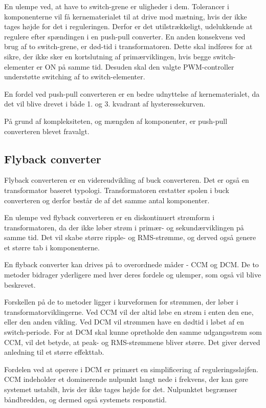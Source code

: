 En ulempe ved, at have to switch-grene er uligheder i dem. Tolerancer i komponenterne vil få kernematerialet til at drive mod mætning, hvis der ikke tages højde for det i reguleringen. Derfor er det utilstrækkeligt, udelukkende at regulere efter spændingen i en push-pull converter. En anden konsekvens ved brug af to switch-grene, er død-tid i transformatoren. Dette skal indføres for at sikre, der ikke sker en kortslutning af primærviklingen, hvis begge switch-elementer er ON på samme tid. Desuden skal den valgte PWM-controller understøtte switching af to switch-elementer. 

En fordel ved push-pull converteren er en bedre udnyttelse af kernematerialet, da det vil blive drevet i både 1. og 3. kvadrant af hysteressekurven. 

På grund af kompleksiteten, og mængden af komponenter, er push-pull converteren blevet fravalgt. 

\subsection{Flyback converter}
Flyback converteren er en videreudvikling af buck converteren. Det er også en transformator baseret typologi. Transformatoren erstatter spolen i buck converteren og derfor består de af det samme antal komponenter.

En ulempe ved flyback converteren er en diskontinuert strømform i transformatoren, da der ikke løber strøm i primær- og sekundærviklingen på samme tid. Det vil skabe større ripple- og RMS-strømme, og derved også genere et større tab i komponenterne\cite{SMPS-topologies}. 

En flyback converter kan drives på to overordnede måder - CCM og DCM. De to metoder bidrager yderligere med hver deres fordele og ulemper, som også vil blive beskrevet. 

Forskellen på de to metoder ligger i kurveformen for strømmen, der løber i transformatorviklingerne. Ved CCM vil der altid løbe en strøm i enten den ene, eller den anden vikling. Ved DCM vil strømmen have en dødtid i løbet af en switch-periode. For at DCM skal kunne opretholde den samme udgangsstrøm som CCM, vil det betyde, at peak- og RMS-strømmene bliver større. Det giver derved anledning til et større effekttab. 

Fordelen ved at operere i DCM er primært en simplificering af reguleringssløjfen. CCM indeholder et dominerende nulpunkt langt nede i frekvens, der kan gøre systemet ustabilt, hvis der ikke tages højde for det. Nulpunktet begrænser båndbredden, og dermed også systemets responstid. 


